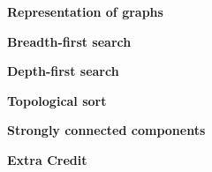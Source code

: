 \documentclass[12pt,twoside]{article}
\begin{document}

{\large 
\textbf{Representation of graphs}}
\begin{problems}

\problem  %

{\large 
\textbf{Breadth-first search}}
\problem  %

\problem  %


\problem  %

\problem

{\large 
\textbf{Depth-first search}}
\problem


\problem

{\large 
\textbf{Topological sort}}
\problem

{\large 
\textbf{Strongly connected components}}
\problem

{\large 
\textbf{Extra Credit}}
\problem

\problem

\problem

\end{problems}
\end{document}
